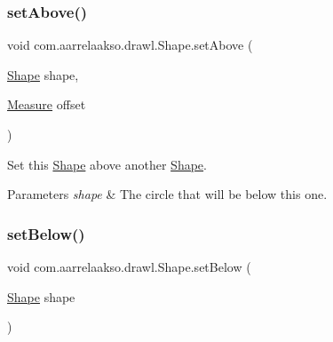 \subsubsection{\texorpdfstring{set\+Above()}{setAbove()}\hspace{0.1cm}{\footnotesize\ttfamily [2/2]}}
{\footnotesize\ttfamily void com.\+aarrelaakso.\+drawl.\+Shape.\+set\+Above (\begin{DoxyParamCaption}\item[{\hyperlink{classcom_1_1aarrelaakso_1_1drawl_1_1_shape}{Shape}}]{shape,  }\item[{\hyperlink{classcom_1_1aarrelaakso_1_1drawl_1_1_measure}{Measure}}]{offset }\end{DoxyParamCaption})\hspace{0.3cm}{\ttfamily [inherited]}}



Set this \hyperlink{classcom_1_1aarrelaakso_1_1drawl_1_1_shape}{Shape} above another \hyperlink{classcom_1_1aarrelaakso_1_1drawl_1_1_shape}{Shape}. 


\begin{DoxyParams}{Parameters}
{\em shape} & The circle that will be below this one. \\
\hline
\end{DoxyParams}
\mbox{\label{classcom_1_1aarrelaakso_1_1drawl_1_1_shape_aa0ec0030515b5096820e4dd030c0b320}} 
\subsubsection{\texorpdfstring{set\+Below()}{setBelow()}\hspace{0.1cm}{\footnotesize\ttfamily [1/2]}}
{\footnotesize\ttfamily void com.\+aarrelaakso.\+drawl.\+Shape.\+set\+Below (\begin{DoxyParamCaption}\item[{\hyperlink{classcom_1_1aarrelaakso_1_1drawl_1_1_shape}{Shape}}]{shape }\end{DoxyParamCaption})\hspace{0.3cm}{\ttfamily [inherited]}}

\mbox{\label{classcom_1_1aarrelaakso_1_1drawl_1_1_shape_aa0dd6332c22877c42b8c3863e5cc579e}} 
